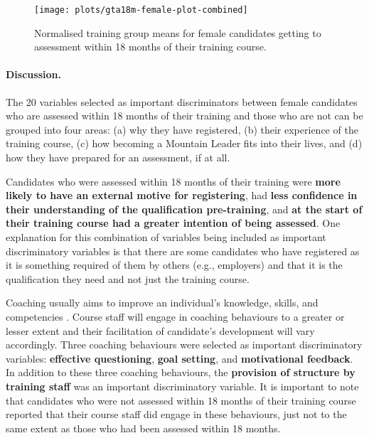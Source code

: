 \documentclass[
  12pt,
  a4paper,
]{book}
\begin{document}
\begin{figure}[H]
\texttt{[image: plots/gta18m-female-plot-combined]} \caption{Normalised training group means for female candidates getting to assessment within 18 months of their training course.}\label{fig:gta18m-female-plot}
\end{figure}

\hypertarget{mts-part-b-female-gta-discussion}{%
\paragraph{Discussion.}\label{mts-part-b-female-gta-discussion}}

The 20 variables selected as important discriminators between female candidates who are assessed within 18 months of their training and those who are not can be grouped into four areas: (a) why they have registered, (b) their experience of the training course, (c) how becoming a Mountain Leader fits into their lives, and (d) how they have prepared for an assessment, if at all.

Candidates who were assessed within 18 months of their training were \textbf{more likely to have an external motive for registering}, had \textbf{less confidence in their understanding of the qualification pre-training}, and \textbf{at the start of their training course had a greater intention of being assessed}. One explanation for this combination of variables being included as important discriminatory variables is that there are some candidates who have registered as it is something required of them by others (e.g., employers) and that it is the qualification they need and not just the training course.

Coaching usually aims to improve an individual's knowledge, skills, and competencies \citep{Wagstaff2018}. Course staff will engage in coaching behaviours to a greater or lesser extent and their facilitation of candidate's development will vary accordingly. Three coaching behaviours were selected as important discriminatory variables: \textbf{effective questioning}, \textbf{goal setting}, and \textbf{motivational feedback}. In addition to these three coaching behaviours, the \textbf{provision of structure by training staff} was an important discriminatory variable. It is important to note that candidates who were not assessed within 18 months of their training course reported that their course staff did engage in these behaviours, just not to the same extent as those who had been assessed within 18 months.
\end{document}
